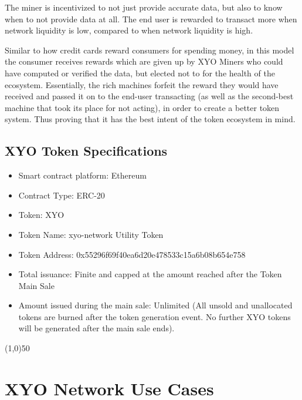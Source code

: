 \documentclass{article}
\begin{document}
The miner is incentivized to not just provide accurate data, but also to know when to not provide data at all. The end user is rewarded to transact more when network liquidity is low, compared to when network liquidity is high.

Similar to how credit cards reward consumers for spending money, in this model the consumer receives rewards which are given up by XYO Miners who could have computed or verified the data, but elected not to for the health of the ecosystem. Essentially, the rich machines forfeit the reward they would have received and passed it on to the end-user transacting (as well as the second-best machine that took its place for not acting), in order to create a better token system. Thus proving that it has the best intent of the token ecosystem in mind.

\subsection {XYO Token Specifications}
\begin{itemize}
\item Smart contract platform: Ethereum
\item Contract Type: ERC-20
\item Token: XYO
\item Token Name: \Gls{xyo-network} Utility Token
\item Token Address: 0x55296f69f40ea6d20e478533c15a6b08b654e758
\item Total issuance: Finite and capped at the amount reached after the Token Main Sale
\item Amount issued during the main sale: Unlimited (All unsold and unallocated tokens are burned after the token generation event. No further XYO tokens will be generated after the main sale ends).
\end{itemize}

\begin{center}
\line(1,0){50}
\end{center}

\section{XYO Network Use Cases}
\end{document}
